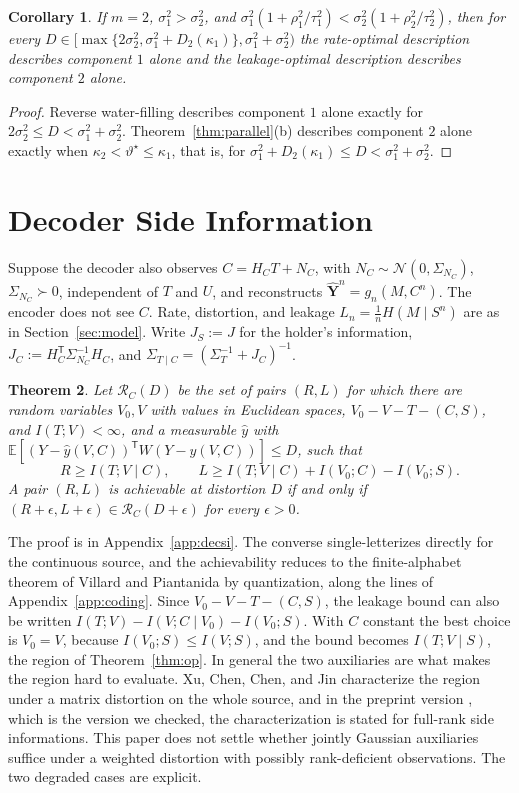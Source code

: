 \documentclass[11pt,onecolumn]{IEEEtran}
\newtheorem{theorem}{Theorem}
\newtheorem{corollary}[theorem]{Corollary}
\newcommand{\E}{\mathbb{E}}
\newcommand{\hY}{\hat{\mathbf Y}}
\begin{document}
\begin{corollary}\label{cor:disjoint}
If $m=2$, $\sigma_1^2>\sigma_2^2$, and
$\sigma_1^2(1+\rho_1^2/\tau_1^2)<\sigma_2^2(1+\rho_2^2/\tau_2^2)$, then for every
$D\in[\max\{2\sigma_2^2,\sigma_1^2+D_2(\kappa_1)\},\sigma_1^2+\sigma_2^2)$ the
rate-optimal description describes component $1$ alone and the
leakage-optimal description describes component $2$ alone.
\end{corollary}

\begin{proof}
Reverse water-filling describes component $1$ alone exactly for
$2\sigma_2^2\le D<\sigma_1^2+\sigma_2^2$. Theorem~\ref{thm:parallel}(b)
describes component $2$ alone exactly when $\kappa_2<\vartheta^\star\le\kappa_1$,
that is, for $\sigma_1^2+D_2(\kappa_1)\le D<\sigma_1^2+\sigma_2^2$.
\end{proof}

\section{Decoder Side Information}
\label{sec:decsi}

Suppose the decoder also observes $C=H_CT+N_C$, with
$N_C\sim\mathcal N(0,\Sigma_{N_C})$, $\Sigma_{N_C}\succ0$, independent of $T$
and $U$, and reconstructs $\hY^n=g_n(M,C^n)$. The
encoder does not see $C$. Rate, distortion, and leakage
$L_n=\tfrac1nH(M\mid S^n)$ are as in Section~\ref{sec:model}. Write
$J_S:=J$ for the holder's information, $J_C:=H_C^{\mathsf T}\Sigma_{N_C}^{-1}H_C$,
and $\Sigma_{T\mid C}=(\Sigma_T^{-1}+J_C)^{-1}$.

\begin{theorem}\label{thm:decregion}
Let $\mathcal R_C(D)$ be the set of pairs $(R,L)$ for which there are
random variables $V_0,V$ with values in Euclidean spaces,
$V_0-V-T-(C,S)$, and $I(T;V)<\infty$, and a
measurable $\hat y$ with
$\E[(Y-\hat y(V,C))^{\mathsf T}W(Y-\hat y(V,C))]\le D$, such that
\[
R\ge I(T;V\mid C),\qquad
L\ge I(T;V\mid C)+I(V_0;C)-I(V_0;S).
\]
A pair $(R,L)$ is achievable at distortion $D$ if and only if
$(R+\epsilon,L+\epsilon)\in\mathcal R_C(D+\epsilon)$ for every $\epsilon>0$.
\end{theorem}

The proof is in Appendix~\ref{app:decsi}. The converse single-letterizes
directly for the continuous source, and the achievability reduces to the
finite-alphabet theorem of Villard and Piantanida
\cite[Theorem~3]{villard2013} by quantization, along the lines of
Appendix~\ref{app:coding}. Since $V_0-V-T-(C,S)$, the leakage bound can also
be written $I(T;V)-I(V;C\mid V_0)-I(V_0;S)$. With $C$ constant the best
choice is $V_0=V$, because $I(V_0;S)\le I(V;S)$, and the bound becomes
$I(T;V\mid S)$, the region of Theorem~\ref{thm:op}. In general the two
auxiliaries are what makes the region hard to evaluate. Xu, Chen, Chen,
and Jin \cite{xu2024} characterize the region under a matrix distortion on
the whole source, and in the preprint version \cite{xuchen2021}, which is
the version we checked, the characterization is stated for full-rank side
informations. This paper does not settle whether jointly Gaussian
auxiliaries suffice under a weighted distortion with possibly
rank-deficient observations. The two degraded cases are explicit.
\end{document}
